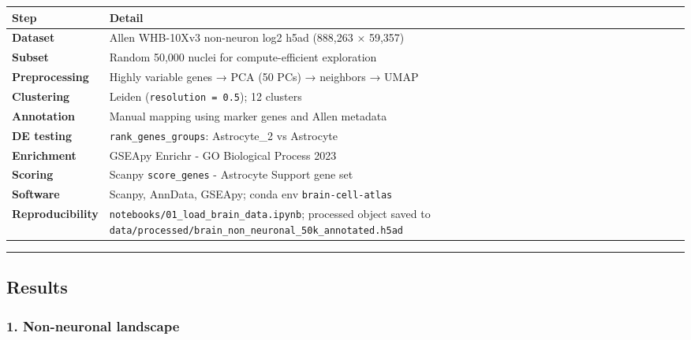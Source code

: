\documentclass[
  11pt,
]{article}
\newcounter{none} %
\begin{document}
{\def\LTcaptype{none} %
\begin{longtable}[]{@{}
  >{\raggedright\arraybackslash}p{}
  >{\raggedright\arraybackslash}p{}@{}}
\toprule\noalign{}
\begin{minipage}[b]{\linewidth}\raggedright
Step
\end{minipage} & \begin{minipage}[b]{\linewidth}\raggedright
Detail
\end{minipage} \\
\midrule\noalign{}
\endhead
\bottomrule\noalign{}
\endlastfoot
\textbf{Dataset} & Allen WHB-10Xv3 non-neuron log2 h5ad (888,263 ×
59,357) \\
\textbf{Subset} & Random 50,000 nuclei for compute-efficient
exploration \\
\textbf{Preprocessing} & Highly variable genes → PCA (50 PCs) →
neighbors → UMAP \\
\textbf{Clustering} & Leiden (\texttt{resolution\ =\ 0.5}); 12
clusters \\
\textbf{Annotation} & Manual mapping using marker genes and Allen
metadata \\
\textbf{DE testing} & \texttt{rank\_genes\_groups}: Astrocyte\_2 vs
Astrocyte \\
\textbf{Enrichment} & GSEApy Enrichr - GO Biological Process 2023 \\
\textbf{Scoring} & Scanpy \texttt{score\_genes} - Astrocyte Support gene
set \\
\textbf{Software} & Scanpy, AnnData, GSEApy; conda env
\texttt{brain-cell-atlas} \\
\textbf{Reproducibility} &
\texttt{notebooks/01\_load\_brain\_data.ipynb}; processed object saved
to \texttt{data/processed/brain\_non\_neuronal\_50k\_annotated.h5ad} \\
\end{longtable}
}

\begin{center}\rule{0.5\linewidth}{0.5pt}\end{center}

\subsection{Results}\label{results}

\subsubsection{1. Non-neuronal landscape}\label{non-neuronal-landscape}
\end{document}
